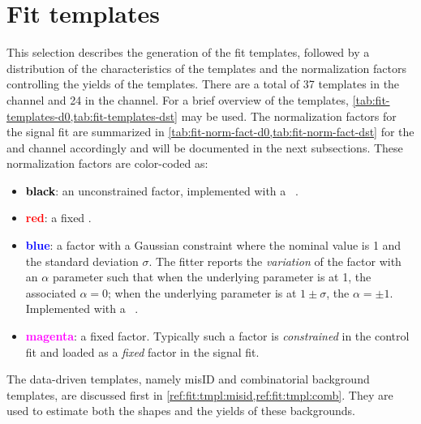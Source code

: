 \section{Fit templates}
\label{ref:fit:tmpl}

This selection describes the generation of the fit templates,
followed by a distribution of the characteristics of the templates and the
normalization factors controlling the yields of the templates.
There are a total of 37 templates in the \Dz channel and 24 in the \Dstar
channel.
For a brief overview of the templates,
\cref{tab:fit-templates-d0,tab:fit-templates-dst} may be used.
The normalization factors for the signal fit are summarized in
\cref{tab:fit-norm-fact-d0,tab:fit-norm-fact-dst} for the \Dz and \Dstar channel
accordingly and will be documented in the next subsections.
These normalization factors are color-coded as:
\begin{itemize}
    \item \textbf{\textcolor{black}{black}}:
        an unconstrained factor,
        implemented with a \HistFactory\ .
    \item \textbf{\textcolor{red}{red}}:
        a fixed .
    \item \textbf{\textcolor{blue}{blue}}:
        a factor with a Gaussian constraint
        where the nominal value is 1 and the standard deviation $\sigma$.
        The fitter reports the \emph{variation} of the factor with an $\alpha$
        parameter such that when the underlying parameter is at 1,
        the associated $\alpha = 0$;
        when the underlying parameter is at $1 \pm \sigma$, the $\alpha = \pm 1$.
        Implemented with a \HistFactory\ .
    \item \textbf{\textcolor{magenta}{magenta}}:
        a fixed  factor.
        Typically such a factor is \emph{constrained} in the control fit and
        loaded as a \emph{fixed} factor in the signal fit.
\end{itemize}

The data-driven templates,
namely \muon misID and combinatorial background templates,
are discussed first in \cref{ref:fit:tmpl:misid,ref:fit:tmpl:comb}.
They are used to estimate both the shapes and the yields of these backgrounds.


